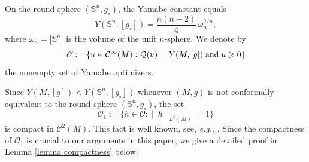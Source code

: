 \documentclass[reqno,11pt]{amsart}
\numberwithin{equation}{section}
\theoremstyle{definition}
\theoremstyle{remark}
\newcommand{\Ss}{\mathbb{S}}
\begin{document}
On the round sphere $(\Ss^n, g_\circ)$, the Yamabe constant equals
\[
Y(\Ss^n,[g_\circ]) = \frac{n(n-2)}{4}\,\omega_n^{2/n},
\]
where $\omega_n = |\Ss^n|$ is the volume of the unit $n$-sphere. We denote by
\begin{equation}\label{eq:optimizer-set}
\mathscr{O} := \left\{ u \in \mathcal{C}^\infty(M) : \mathcal{Q}(u) = Y(M,[g])\; {\rm and} \;  u \geqslant 0 \right\}
\end{equation}
the nonempty set of Yamabe optimizers.

Since $Y(M,[g]) < Y(\Ss^n,[g_\circ])$ whenever $(M,g)$ is not conformally equivalent 
to the round sphere $(\Ss^n, g_\circ)$, the set
\begin{equation}
\label{O1 compact}
\mathscr{O}_1 := \{ h \in \mathscr{O} : \|h\|_{L^p(M)} = 1 \}
\end{equation}
is compact in $\mathcal{C}^2(M)$. 
This fact is well known, 
see, {\it e.g.}, \cite[Section 4]{LP}. Since the compactness of $\mathscr O_1$ is 
crucial to our arguments in this paper, we give a detailed proof in 
Lemma \ref{lemma compactness} below.
\end{document}

